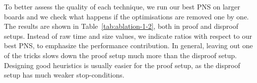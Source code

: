 \documentclass[conference]{IEEEtran}
\theoremstyle{definition}
\begin{document}
To better assess the quality of each technique, we run our best PNS on larger boards and we check what happens if the optimisations are removed one by one. The results are shown in Table~\ref{tab:ablation-1-2}, both in proof and disproof setups. Instead of raw time and size values, we indicate ratios with respect to our best PNS, to emphasize the performance contribution. In general, leaving out one of the tricks slows down the proof setup much more than the disproof setup. Designing good heuristics is usually easier for the proof setup, as the disproof setup has much weaker stop-conditions. 




\end{document}
